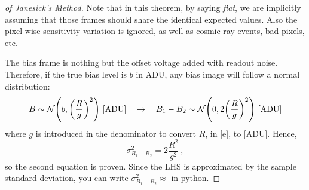 \begin{proof}[of Janesick's Method]
Note that in this theorem, by saying \textit{flat}, we are implicitly assuming that those frames should share the identical expected values. Also the pixel-wise sensitivity variation is ignored, as well as cosmic-ray events, bad pixels, etc.

The bias frame is nothing but the offset voltage added with readout noise. Therefore, if the true bias level is $ b $ in ADU, any bias image will follow a normal distribution:
\begin{equation*}
  B \sim \mathcal{N} \qty( b, \qty(\frac{R}{g})^2 ) ~\mathrm{[ADU]}
  \quad \rightarrow \quad
  B_1 - B_2 \sim \mathcal{N} \qty( 0, 2\qty(\frac{R}{g})^2 ) ~\mathrm{[ADU]}
\end{equation*}
where $ g $ is introduced in the denominator to convert $ R $, in [e], to [ADU]. Hence, 
\begin{equation*}
  \sigma^2_{B_1 - B_2} 
    = 2\frac{R^2}{g^2} ~,
\end{equation*}
so the second equation is proven. Since the LHS is approximated by the sample standard deviation, you can write $ \sigma^2_{B_1 - B_2} \approx $  in python.


\end{proof}
